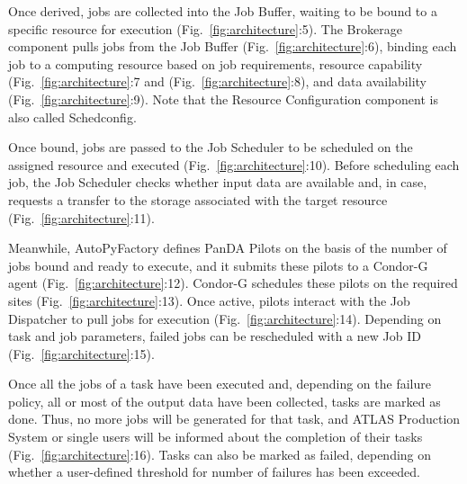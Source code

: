 Once derived, jobs are collected into the Job Buffer, waiting to be bound to a
specific resource for execution (Fig.~\ref{fig:architecture}:5). The Brokerage
component pulls jobs from the Job Buffer (Fig.~\ref{fig:architecture}:6),
binding each job to a computing resource based on job requirements, resource
capability (Fig.~\ref{fig:architecture}:7 and (Fig.~\ref{fig:architecture}:8),
and data availability (Fig.~\ref{fig:architecture}:9). Note that the Resource
Configuration component is also called Schedconfig.

Once bound, jobs are passed to the Job Scheduler to be scheduled on the
assigned resource and executed (Fig.~\ref{fig:architecture}:10). Before
scheduling each job, the Job Scheduler checks whether input data are available
and, in case, requests a transfer to the storage associated with the target
resource (Fig.~\ref{fig:architecture}:11).

Meanwhile, AutoPyFactory defines PanDA Pilots on the basis of the number of
jobs bound and ready to execute, and it submits these pilots to a Condor-G
agent (Fig.~\ref{fig:architecture}:12). Condor-G schedules these pilots on the
required sites (Fig.~\ref{fig:architecture}:13). Once active, pilots interact
with the Job Dispatcher to pull jobs for execution
(Fig.~\ref{fig:architecture}:14). Depending on task and job parameters, failed
jobs can be rescheduled with a new Job ID (Fig.~\ref{fig:architecture}:15).

Once all the jobs of a task have been executed and, depending on the failure
policy, all or most of the output data have been collected, tasks are marked as
done. Thus, no more jobs will be generated for that task, and ATLAS Production
System or single users will be informed about the completion of their tasks
(Fig.~\ref{fig:architecture}:16). Tasks can also be marked as failed, depending
on whether a user-defined threshold for number of failures has been exceeded.



